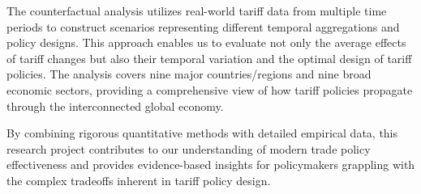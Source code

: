 The counterfactual analysis utilizes real-world tariff data from multiple time periods to construct scenarios representing different temporal aggregations and policy designs. This approach enables us to evaluate not only the average effects of tariff changes but also their temporal variation and the optimal design of tariff policies. The analysis covers nine major countries/regions and nine broad economic sectors, providing a comprehensive view of how tariff policies propagate through the interconnected global economy.

By combining rigorous quantitative methods with detailed empirical data, this research project contributes to our understanding of modern trade policy effectiveness and provides evidence-based insights for policymakers grappling with the complex tradeoffs inherent in tariff policy design.
